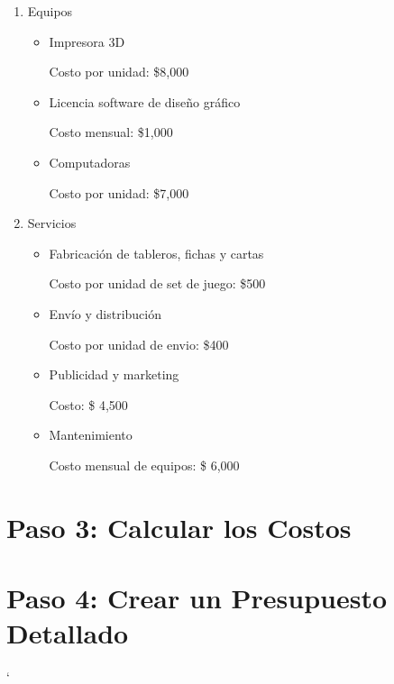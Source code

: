 \documentclass[12pt]{article}
\begin{document}
\begin{enumerate}
	\item Equipos

	\begin{itemize}
		\item Impresora 3D

		Costo por unidad: \$8,000

		\item Licencia software de diseño gráfico

		Costo mensual: \$1,000

		\item Computadoras

		Costo por unidad: \$7,000

	\end{itemize}

	\item Servicios

	\begin{itemize}
		\item Fabricación de tableros, fichas y cartas

		Costo por unidad de set de juego: \$500

		\item Envío y distribución

		Costo por unidad de envio: \$400

		\item Publicidad y marketing

		Costo: \$ 4,500

		\item Mantenimiento

		Costo mensual de equipos: \$ 6,000
	\end{itemize}





\end{enumerate}



 \section*{Paso 3: Calcular los Costos}


 \section*{Paso 4: Crear un Presupuesto Detallado}
    

`
\end{document}
